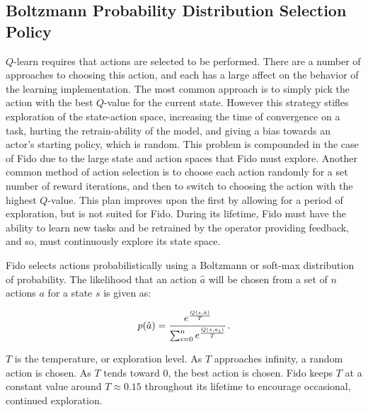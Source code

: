 \subsection{Boltzmann Probability Distribution Selection Policy}

$Q$-learn requires that actions are selected to be performed. There are a number of approaches to choosing this action, and each has a large affect on the behavior of the learning implementation. The most common approach is to simply pick the action with the best $Q$-value for the current state. However this strategy stifles exploration of the state-action space, increasing the time of convergence on a task, hurting the retrain-ability of the model, and giving a bias towards an actor's starting policy, which is random. This problem is compounded in the case of Fido due to the large state and action spaces that Fido must explore. Another common method of action selection is to choose each action randomly for a set number of reward iterations, and then to switch to choosing the action with the highest $Q$-value. This plan improves upon the first by allowing for a period of exploration, but is not suited for Fido. During its lifetime, Fido must have the ability to learn new tasks and be retrained by the operator providing feedback, and so, must continuously explore its state space.

Fido selects actions probabilistically using a Boltzmann or soft-max distribution of probability. The likelihood that an action $\hat{a}$ will be chosen from a set of $n$ actions $a$ for a state $s$ is given as:

\begin{equation}
	p(\hat{a}) = \cfrac{e^{\frac{Q(s, \hat{a})}{T}}}{\sum_{i=0}^{n}e^{\frac{Q(s, a_i)}{T}}}
	\,.
	\label{equ::boltzmann}
\end{equation}

$T$ is the temperature, or exploration level. As $T$ approaches infinity, a random action is chosen. As $T$ tends toward 0, the best action is chosen. Fido keeps $T$ at a constant value around $T \approx 0.15$ throughout its lifetime to encourage occasional, continued exploration.
